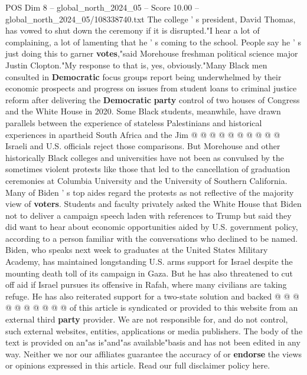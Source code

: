 \begin{textsample}{POS Dim 8 – global\_north\_2024\_05 – Score 10.00 – global\_north\_2024\_05/108338740.txt}
The college ' s president, David Thomas, has vowed to shut down the ceremony if it is disrupted."I hear a lot of complaining, a lot of lamenting that he ' s coming to the school.
People say he ' s just doing this to garner \textbf{votes},"said Morehouse freshman political science major Justin Clopton."My response to that is, yes, obviously."Many Black men consulted in \textbf{Democratic} focus groups report being underwhelmed by their economic prospects and progress on issues from student loans to criminal justice reform after delivering the \textbf{Democratic} \textbf{party} control of two houses of Congress and the White House in 2020.
Some Black students, meanwhile, have drawn parallels between the experience of stateless Palestinians and historical experiences in apartheid South Africa and the Jim @ @ @ @ @ @ @ @ @ @ Israeli and U.S. officials reject those comparisons.
But Morehouse and other historically Black colleges and universities have not been as convulsed by the sometimes violent protests like those that led to the cancellation of graduation ceremonies at Columbia University and the University of Southern California.
Many of Biden ' s top aides regard the protests as not reflective of the majority view of \textbf{voters}.
Students and faculty privately asked the White House that Biden not to deliver a campaign speech laden with references to Trump but said they did want to hear about economic opportunities aided by U.S. government policy, according to a person familiar with the conversations who declined to be named.
Biden, who speaks next week to graduates at the United States Military Academy, has maintained longstanding U.S. arms support for Israel despite the mounting death toll of its campaign in Gaza.
But he has also threatened to cut off aid if Israel pursues its offensive in Rafah, where many civilians are taking refuge.
He has also reiterated support for a two-state solution and backed @ @ @ @ @ @ @ @ @ @ of this article is syndicated or provided to this website from an external third \textbf{party} provider.
We are not responsible for, and do not control, such external websites, entities, applications or media publishers.
The body of the text is provided on an"as is"and"as available"basis and has not been edited in any way.
Neither we nor our affiliates guarantee the accuracy of or \textbf{endorse} the views or opinions expressed in this article.
Read our full disclaimer policy here.

\end{textsample}
